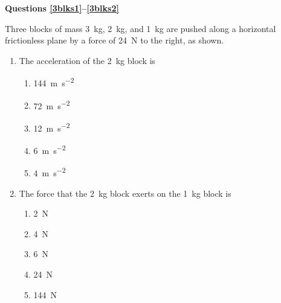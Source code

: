 \documentclass{../../../oss-apphys}
\begin{document}
\begin{multicols}{2}
  \textbf{Questions \ref{3blks1}--\ref{3blks2}}

  Three blocks of mass \SI{3}{\kilo\gram}, \SI{2}{\kilo\gram}, and
  \SI{1}{\kilo\gram} are pushed along a horizontal frictionless plane by a
  force of \SI{24}{\newton} to the right, as shown.
  \begin{center}
  \end{center}
  \begin{enumerate}[resume,leftmargin=18pt]
  \item The acceleration of the \SI{2}{\kilo\gram} block is
    \begin{enumerate}[nosep,leftmargin=18pt,label=(\Alph*)]
    \item\SI{144}{\metre\per\second\squared}
    \item\SI{72}{\metre\per\second\squared}
    \item\SI{12}{\metre\per\second\squared}
    \item\SI{6}{\metre\per\second\squared}
    \item\SI{4}{\metre\per\second\squared}
    \end{enumerate}
    \label{3blks1}
    
  \item The force that the \SI{2}{\kilo\gram} block exerts on the
    \SI{1}{\kilo\gram} block is
    \begin{enumerate}[nosep,leftmargin=18pt,label=(\Alph*)]
    \item \SI{2}{\newton}
    \item \SI{4}{\newton}
    \item \SI{6}{\newton}
    \item \SI{24}{\newton}
    \item \SI{144}{\newton}
    \end{enumerate}
    \label{3blks2}
    

\end{enumerate}
\end{multicols}
\end{document}

